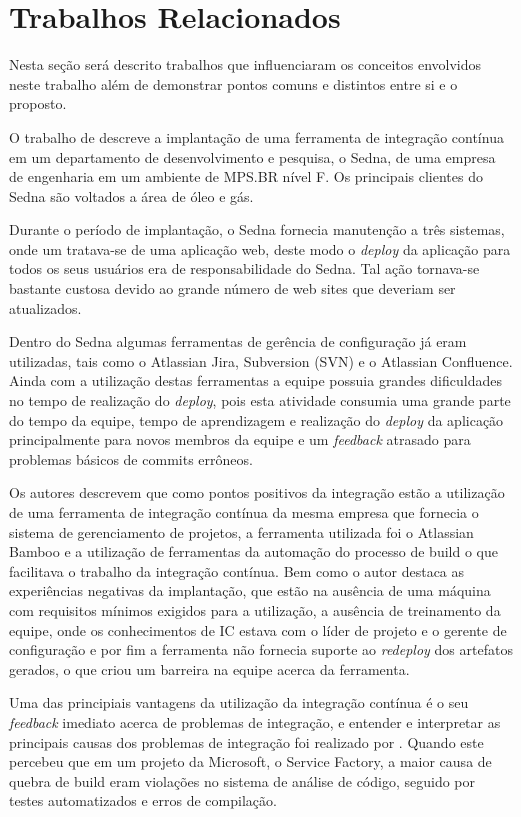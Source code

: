 \chapter{Trabalhos Relacionados}\label{trabalhorel}
Nesta seção será descrito trabalhos que influenciaram os conceitos envolvidos neste trabalho além de demonstrar pontos comuns e distintos entre si e o proposto.

O trabalho de  descreve a implantação de uma ferramenta de integração contínua em um departamento de desenvolvimento e pesquisa, o Sedna, de uma empresa de engenharia em um ambiente de MPS.BR nível F. Os principais clientes do Sedna são voltados a área de óleo e gás.

Durante o período de implantação, o Sedna fornecia manutenção a três sistemas, onde um tratava-se de uma aplicação web, deste modo o \textit{deploy} da aplicação para todos os seus usuários era de responsabilidade do Sedna. Tal ação tornava-se bastante custosa devido ao grande número de web sites que deveriam ser atualizados.
	
Dentro do Sedna algumas ferramentas de gerência de configuração já eram utilizadas, tais como o Atlassian Jira, Subversion (SVN) e o Atlassian Confluence. Ainda com a utilização destas ferramentas a equipe possuia grandes dificuldades no tempo de realização do \textit{deploy}, pois esta atividade consumia uma grande parte do tempo da equipe, tempo de aprendizagem e realização do \textit{deploy} da aplicação principalmente para novos membros da equipe e um \textit{feedback} atrasado para problemas básicos de commits errôneos.

Os autores descrevem que como pontos positivos da integração estão a utilização de uma ferramenta de integração contínua da mesma empresa que fornecia o sistema de gerenciamento de projetos, a ferramenta utilizada foi o Atlassian Bamboo e a utilização de ferramentas da automação do processo de build o que facilitava o trabalho da integração contínua. Bem como o autor destaca as experiências negativas da implantação, que estão na ausência de uma máquina com requisitos mínimos exigidos para a utilização, a ausência de treinamento da equipe, onde os conhecimentos de IC estava com o líder de projeto e o gerente de configuração e por fim a ferramenta não fornecia suporte ao \textit{redeploy} dos artefatos gerados, o que criou um barreira na equipe acerca da ferramenta.


\cite{abdul2012}

Uma das principiais vantagens da utilização da integração contínua é o seu \textit{feedback} imediato acerca de problemas de integração, e entender e interpretar as principais causas dos problemas de integração foi realizado por . Quando este percebeu que em um projeto da Microsoft, o Service Factory, a maior causa de quebra de build eram violações no sistema de análise de código, seguido por testes automatizados e erros de compilação.


